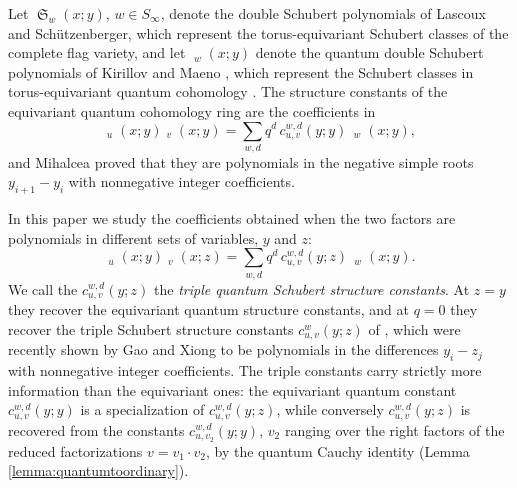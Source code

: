 \documentclass{amsart}
\theoremstyle{definition}
\theoremstyle{remark}
\numberwithin{equation}{section}
\DeclareMathOperator{\sch}{\mathfrak{S}}
\DeclareMathOperator{\qsch}{\widetilde{\mathfrak{S}}}
\begin{document}
Let $\sch_w(x;y)$, $w\in S_\infty$, denote the double Schubert polynomials of Lascoux and Sch\"utzenberger, which represent the torus-equivariant Schubert classes of the complete flag variety, and let $\qsch_w(x;y)$ denote the quantum double Schubert polynomials of Kirillov and Maeno \cite{kirillov2000quantum}, which represent the Schubert classes in torus-equivariant quantum cohomology \cite{lam2014quantum}. The structure constants of the equivariant quantum cohomology ring are the coefficients in
$$\qsch_u(x;y)\qsch_v(x;y)=\sum_{w,d}q^d\,c_{u,v}^{w,d}(y;y)\,\qsch_w(x;y),$$
and Mihalcea \cite{mihalcea2006positivity} proved that they are polynomials in the negative simple roots $y_{i+1}-y_i$ with nonnegative integer coefficients.

In this paper we study the coefficients obtained when the two factors are polynomials in different sets of variables, $y$ and $z$:
$$\qsch_u(x;y)\qsch_v(x;z)=\sum_{w,d}q^d\,c_{u,v}^{w,d}(y;z)\,\qsch_w(x;y).$$
We call the $c_{u,v}^{w,d}(y;z)$ the \emph{triple quantum Schubert structure constants}. At $z=y$ they recover the equivariant quantum structure constants, and at $q=0$ they recover the triple Schubert structure constants $c_{u,v}^w(y;z)$ of \cite{samuelmolev}, which were recently shown by Gao and Xiong \cite{gao2025grahampositivitytripleschubert} to be polynomials in the differences $y_i-z_j$ with nonnegative integer coefficients. The triple constants carry strictly more information than the equivariant ones: the equivariant quantum constant $c_{u,v}^{w,d}(y;y)$ is a specialization of $c_{u,v}^{w,d}(y;z)$, while conversely $c_{u,v}^{w,d}(y;z)$ is recovered from the constants $c_{u,v_2}^{w,d}(y;y)$, $v_2$ ranging over the right factors of the reduced factorizations $v=v_1\cdot v_2$, by the quantum Cauchy identity (Lemma \ref{lemma:quantumtoordinary}).
\end{document}
